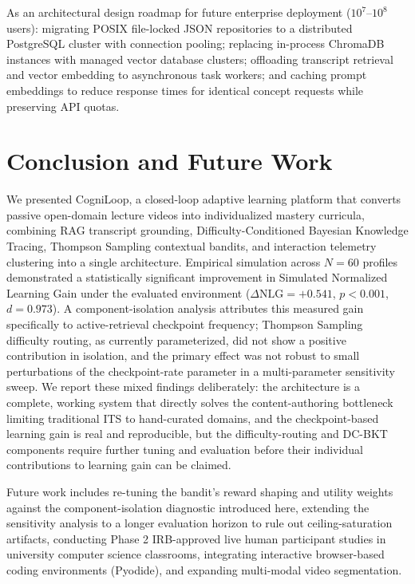 \documentclass[pdflatex,sn-apa]{sn-jnl}
\begin{document}
As an architectural design roadmap for future enterprise deployment ($10^7$--$10^8$ users): migrating POSIX file-locked JSON repositories to a distributed PostgreSQL cluster with connection pooling; replacing in-process ChromaDB instances with managed vector database clusters; offloading transcript retrieval and vector embedding to asynchronous task workers; and caching prompt embeddings to reduce response times for identical concept requests while preserving API quotas.

\section{Conclusion and Future Work}\label{sec7}

We presented CogniLoop, a closed-loop adaptive learning platform that converts passive open-domain lecture videos into individualized mastery curricula, combining RAG transcript grounding, Difficulty-Conditioned Bayesian Knowledge Tracing, Thompson Sampling contextual bandits, and interaction telemetry clustering into a single architecture. Empirical simulation across $N=60$ profiles demonstrated a statistically significant improvement in Simulated Normalized Learning Gain under the evaluated environment ($\Delta\text{NLG}=+0.541$, $p<0.001$, $d=0.973$). A component-isolation analysis attributes this measured gain specifically to active-retrieval checkpoint frequency; Thompson Sampling difficulty routing, as currently parameterized, did not show a positive contribution in isolation, and the primary effect was not robust to small perturbations of the checkpoint-rate parameter in a multi-parameter sensitivity sweep. We report these mixed findings deliberately: the architecture is a complete, working system that directly solves the content-authoring bottleneck limiting traditional ITS to hand-curated domains, and the checkpoint-based learning gain is real and reproducible, but the difficulty-routing and DC-BKT components require further tuning and evaluation before their individual contributions to learning gain can be claimed.

Future work includes re-tuning the bandit's reward shaping and utility weights against the component-isolation diagnostic introduced here, extending the sensitivity analysis to a longer evaluation horizon to rule out ceiling-saturation artifacts, conducting Phase 2 IRB-approved live human participant studies in university computer science classrooms, integrating interactive browser-based coding environments (Pyodide), and expanding multi-modal video segmentation.
\end{document}
